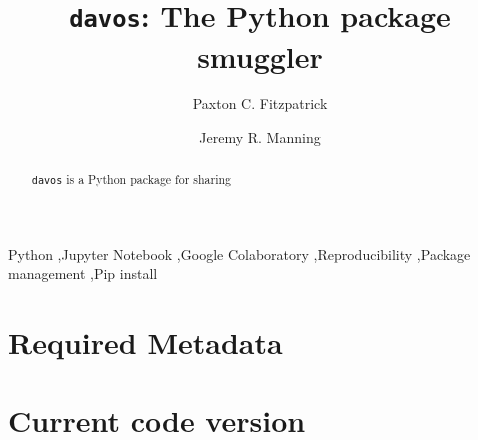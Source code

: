 \documentclass[preprint,12pt, a4paper]{elsarticle}
\begin{document}
\begin{frontmatter}

\title{\texttt{davos}: The Python package smuggler}
\author{Paxton C. Fitzpatrick}
\author{Jeremy R. Manning}
\address{Department of Psychological and Brain Sciences\\Dartmouth College, Hanover, NH 03755}


\begin{abstract}
\texttt{davos} is a Python package for sharing 

\end{abstract}


\begin{keyword}
Python \sep Jupyter Notebook \sep Google Colaboratory \sep Reproducibility \sep Package management \sep Pip install
\end{keyword}

\end{frontmatter}


\section*{Required Metadata}

\section*{Current code version}
\end{document}
